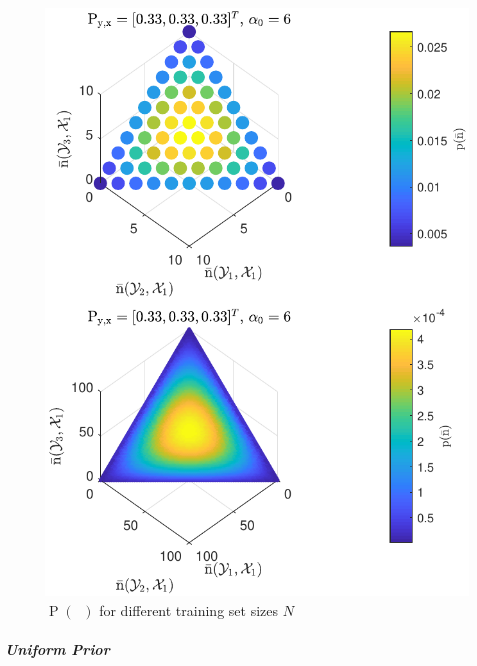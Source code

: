 \documentclass[12pt]{article}
\DeclareMathOperator{\nbarrm}{\bar{\mathrm{n}}}
\DeclareMathOperator{\Prm}{\mathrm{P}}
\begin{document}
\begin{figure}
\centering
\includegraphics[width=0.7\linewidth]{P_nbar_N.pdf}
\caption{$\Prm(\nbarrm)$ for different training set sizes $N$}
\label{fig:P_nbar_N}
\end{figure}




\subparagraph{Uniform Prior}
\end{document}
